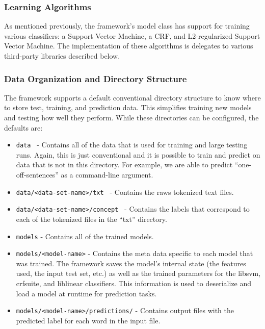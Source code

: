 \documentclass[preprint]{style}
\begin{document}
\subsubsection{Learning Algorithms}

As mentioned previously, the framework's model class has support for training various classifiers: a Support Vector Machine, a CRF, and L2-regularized Support Vector Machine. The implementation of these algorithms is delegates to various third-party libraries described below.

\subsubsection{Data Organization and Directory Structure}


The framework supports a default conventional directory structure to know where to store test, training, and prediction data. This simplifies training new models and testing how well they perform. While these directories can be configured, the defaults are:

\begin{itemize}

\item {\tt data } -  Contains all of the data that is used for training and large testing runs. Again, this is just conventional and it is possible to train and predict on data that is not in this directory. For example, we are able to predict ``one-off-sentences'' as a command-line argument.

\item {\tt data/<data-set-name>/txt } - Contains the raws tokenized text files.

\item {\tt data/<data-set-name>/concept } - Contains the labels that correspond to each of the tokenized files in the ``txt'' directory.

\item {\tt models} - Contains all of the trained models.

\item {\tt models/<model-name>} - Contains the meta data specific to each model that was trained. The framework saves the model's internal state (the features used, the input test set, etc.) as well as the trained parameters for the libsvm, crfsuite, and liblinear classifiers. This information is used to deserialize and load a model at runtime for prediction tasks.

\item {\tt models/<model-name>/predictions/} - Contains output files with the predicted label for each word in the input file.

\end{itemize}
\end{document}
